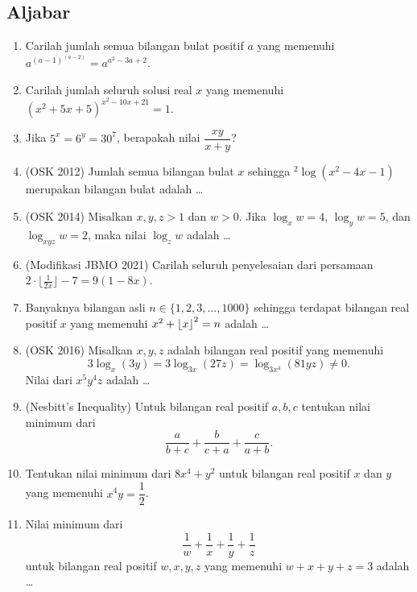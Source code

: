     \subsection{Aljabar}
    \begin{enumerate}
        \item Carilah jumlah semua bilangan bulat positif $a$ yang memenuhi $a^{(a-1)^{(a-2)}}=a^{a^2-3a+2}$.
        
        \item Carilah jumlah seluruh solusi real $x$ yang memenuhi $(x^2+5x+5)^{x^2-10x+21}=1.$
        
        \item Jika $5^x=6^y=30^7$, berapakah nilai $\dfrac{xy}{x+y}$?
        
        \item (OSK 2012) Jumlah semua bilangan bulat $x$ sehingga $^2 \log (x^2-4x-1)$ merupakan bilangan bulat adalah \dots
        
        \item (OSK 2014) Misalkan $x,y,z>1$ dan $w>0$. Jika $\log_x w = 4$, $\log_y w = 5$, dan $\log_{xyz} w = 2$, maka nilai $\log_z w$ adalah \dots 
        
        \item (Modifikasi JBMO 2021) Carilah seluruh penyelesaian dari persamaan $2\cdot \lfloor{\frac{1}{2x}}\rfloor - 7 = 9(1 - 8x)$.
        
        \item Banyaknya bilangan asli $n \in \{1,2,3,\dots,1000\}$ sehingga terdapat bilangan real positif $x$ yang memenuhi $x^2+\left\lfloor x \right\rfloor^2=n$ adalah \dots
        
        \item (OSK 2016) Misalkan $x,y,z$ adalah bilangan real positif yang memenuhi $$3 \log_x (3y) = 3 \log_{3x} (27z) = \log_{3x^4} (81yz) \neq 0.$$ Nilai dari $x^5y^4z$ adalah \dots
        
        \item (Nesbitt's Inequality) Untuk bilangan real positif $a,b,c$ tentukan nilai minimum dari $$\dfrac{a}{b+c}+\dfrac{b}{c+a}+\dfrac{c}{a+b}.$$
        
        \item Tentukan nilai minimum dari $8x^4+y^2$ untuk bilangan real positif $x$ dan $y$ yang memenuhi $x^4y=\dfrac{1}{2}$.
        
        \item Nilai minimum dari $$\dfrac{1}{w}+\dfrac{1}{x}+\dfrac{1}{y}+\dfrac{1}{z}$$
        untuk bilangan real positif $w,x,y,z$ yang memenuhi $w+x+y+z=3$ adalah \dots
        

\end{enumerate}
